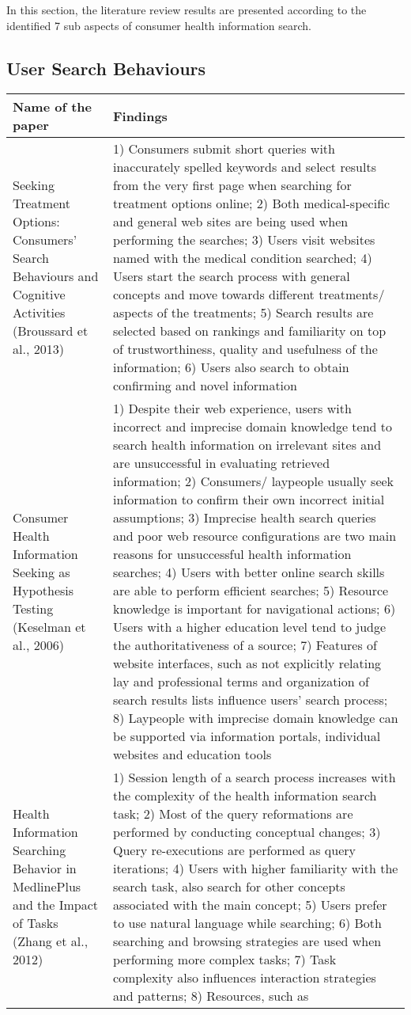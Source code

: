 \documentclass[]{article}
\begin{document}
In this section, the literature review results are presented according to the identified 7 sub aspects of consumer health information search.   

\subsection{User Search Behaviours}

\begin{center}
	\begin{longtable}{||p{4cm} | p{10cm}||} 
		\hline
		\textbf{Name of the paper} & \textbf{Findings}\\ [0.5ex] 
		\hline\hline
		Seeking Treatment Options: Consumers’ Search Behaviours and Cognitive Activities (Broussard et al., 2013) & 1) Consumers submit short queries with inaccurately spelled keywords and select results from the very first page when searching for treatment options online; 2) Both medical-specific and general web sites are being used when performing the searches; 3) Users visit websites named with the medical condition searched; 4) Users start the search process with general concepts and move towards different treatments/ aspects of the treatments; 5) Search results are selected based on rankings and familiarity on top of trustworthiness, quality and usefulness of the information; 6) Users also search to obtain confirming and novel information \\ \hline Consumer Health Information Seeking as Hypothesis Testing (Keselman et al., 2006) & 1) Despite their web experience, users with incorrect and imprecise domain knowledge tend to search health information on irrelevant sites and are unsuccessful in evaluating retrieved information; 2) Consumers/ laypeople usually seek information to confirm their own incorrect initial assumptions; 3) Imprecise health search queries and poor web resource configurations are two main reasons for unsuccessful health information searches; 4) Users with better online search skills are able to perform efficient searches; 5) Resource knowledge is important for navigational actions; 6) Users with a higher education level tend to judge the authoritativeness of a source; 7) Features of website interfaces, such as not explicitly relating lay and professional terms and organization of search results lists influence users’ search process; 8) Laypeople with imprecise domain knowledge can be supported via information portals, individual websites and education tools \\ \hline Health Information Searching Behavior in MedlinePlus and the Impact of Tasks (Zhang et al., 2012) & 1) Session length of a search process increases with the complexity of the health information search task; 2) Most of the query reformations are performed by conducting conceptual changes; 3) Query re-executions are performed as query iterations; 4) Users with higher familiarity with the search task, also search for other concepts associated with the main concept; 5) Users prefer to use natural language while searching; 6) Both searching and browsing strategies are used when performing more complex tasks; 7) Task complexity also influences interaction strategies and patterns; 8) Resources, such as 
\end{longtable}
\end{center}
\end{document}
